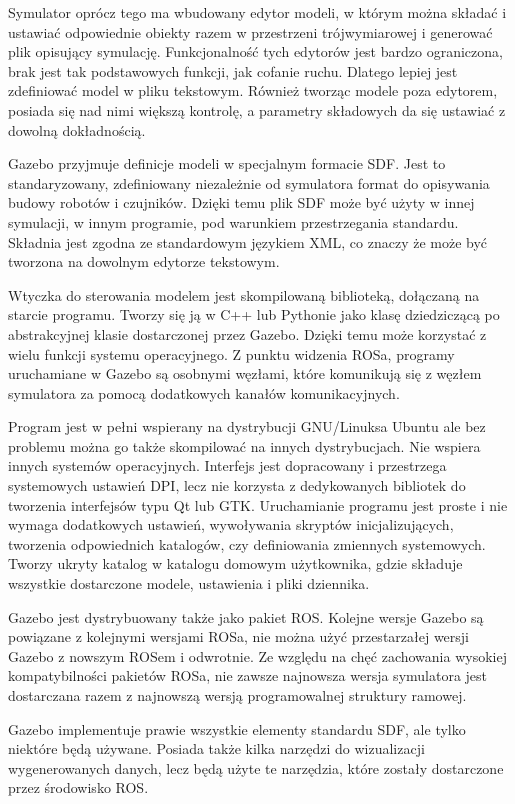 	Symulator oprócz tego ma wbudowany edytor modeli, w którym można składać i ustawiać odpowiednie obiekty razem w przestrzeni trójwymiarowej
	i generować plik opisujący symulację.
	Funkcjonalność tych edytorów jest bardzo ograniczona, brak jest tak podstawowych funkcji, jak cofanie ruchu.
	Dlatego lepiej jest zdefiniować model w pliku tekstowym.
	Również tworząc modele poza edytorem, posiada się nad nimi większą kontrolę, a parametry składowych da się ustawiać z dowolną dokładnością.

	Gazebo przyjmuje definicje modeli w specjalnym formacie SDF. Jest to standaryzowany, zdefiniowany niezależnie od symulatora format do opisywania budowy robotów i czujników.
	Dzięki temu plik SDF może być użyty w innej symulacji, w innym programie, pod warunkiem przestrzegania standardu.
	Składnia jest zgodna ze standardowym językiem XML, co znaczy że może być tworzona na dowolnym edytorze tekstowym.

	Wtyczka do sterowania modelem jest skompilowaną biblioteką, dołączaną na starcie programu.
	Tworzy się ją w C++ lub Pythonie jako klasę dziedziczącą po abstrakcyjnej klasie dostarczonej przez Gazebo.
	Dzięki temu może korzystać z wielu funkcji systemu operacyjnego.
	Z punktu widzenia ROSa, programy uruchamiane w Gazebo są osobnymi węzłami, które komunikują się z węzłem symulatora za pomocą dodatkowych kanałów komunikacyjnych.

	Program jest w pełni wspierany na dystrybucji GNU/Linuksa Ubuntu ale bez problemu można go także skompilować na innych dystrybucjach.
	Nie wspiera innych systemów operacyjnych.
	Interfejs jest dopracowany i przestrzega systemowych ustawień DPI, lecz nie korzysta z dedykowanych bibliotek do tworzenia 
	interfejsów typu Qt lub GTK.
	Uruchamianie programu jest proste i nie wymaga dodatkowych ustawień, wywoływania skryptów inicjalizujących, 
	tworzenia odpowiednich katalogów, czy definiowania zmiennych systemowych.
	Tworzy ukryty katalog w katalogu domowym użytkownika, gdzie składuje wszystkie dostarczone modele, ustawienia i pliki dziennika.

	Gazebo jest dystrybuowany także jako pakiet ROS.
	Kolejne wersje Gazebo są powiązane z kolejnymi wersjami ROSa, nie można użyć przestarzałej wersji Gazebo z nowszym ROSem i odwrotnie.
	Ze względu na chęć zachowania wysokiej kompatybilności pakietów ROSa, nie zawsze najnowsza wersja symulatora jest dostarczana razem z najnowszą wersją programowalnej struktury ramowej.
	
	Gazebo implementuje prawie wszystkie elementy standardu SDF, ale tylko niektóre będą używane. Posiada także kilka narzędzi do wizualizacji wygenerowanych danych, lecz będą użyte te narzędzia, które zostały dostarczone przez środowisko ROS.
	
